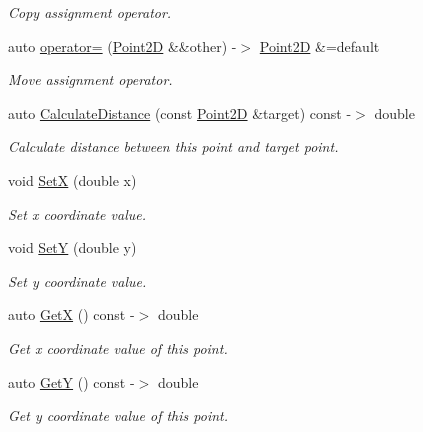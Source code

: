 \begin{DoxyCompactItemize}
\begin{DoxyCompactList}\small\item\em Copy assignment operator. \end{DoxyCompactList}\item 
auto \hyperlink{classprogrammers_1_1geometry_1_1Point2D_ac5ceadc06a745b1189fceff65eda53b0}{operator=} (\hyperlink{classprogrammers_1_1geometry_1_1Point2D}{Point2D} \&\&other) -\/$>$ \hyperlink{classprogrammers_1_1geometry_1_1Point2D}{Point2D} \&=default
\begin{DoxyCompactList}\small\item\em Move assignment operator. \end{DoxyCompactList}\item 
auto \hyperlink{classprogrammers_1_1geometry_1_1Point2D_a724e8f68efe2a33069335a8401ecfc70}{Calculate\+Distance} (const \hyperlink{classprogrammers_1_1geometry_1_1Point2D}{Point2D} \&target) const -\/$>$ double
\begin{DoxyCompactList}\small\item\em Calculate distance between this point and target point. \end{DoxyCompactList}\item 
void \hyperlink{classprogrammers_1_1geometry_1_1Point2D_ac9bf761fd09d5c29459db2b2aa3379e1}{SetX} (double x)
\begin{DoxyCompactList}\small\item\em Set x coordinate value. \end{DoxyCompactList}\item 
void \hyperlink{classprogrammers_1_1geometry_1_1Point2D_aacd2306ed57634d39f22c41f760d95a4}{SetY} (double y)
\begin{DoxyCompactList}\small\item\em Set y coordinate value. \end{DoxyCompactList}\item 
auto \hyperlink{classprogrammers_1_1geometry_1_1Point2D_a41fbc656ae357f7fe365ed5b6eba5eb1}{GetX} () const -\/$>$ double
\begin{DoxyCompactList}\small\item\em Get x coordinate value of this point. \end{DoxyCompactList}\item 
auto \hyperlink{classprogrammers_1_1geometry_1_1Point2D_a28ade425318accb547519a066342dd47}{GetY} () const -\/$>$ double
\begin{DoxyCompactList}\small\item\em Get y coordinate value of this point. \end{DoxyCompactList}\item 

\end{DoxyCompactItemize}
